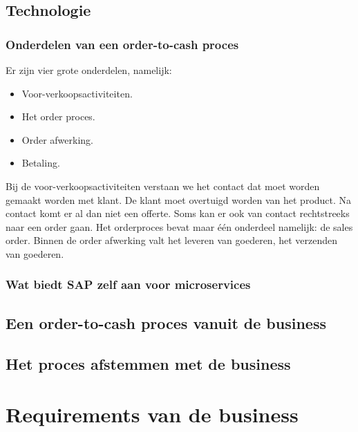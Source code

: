 \subsection{Technologie}
\subsubsection{Onderdelen van een order-to-cash proces}
Er zijn vier grote onderdelen, namelijk:
\begin{itemize}
	\item Voor-verkoopsactiviteiten.
	\item Het order proces.
	\item Order afwerking.
	\item Betaling.
\end{itemize}
Bij de voor-verkoopsactiviteiten verstaan we het contact dat moet worden gemaakt worden met klant. De klant moet overtuigd worden van het product. Na contact komt er al dan niet een offerte. Soms kan er ook van contact rechtstreeks naar een order gaan. 
Het orderproces bevat maar één onderdeel namelijk: de sales order. 
Binnen de order afwerking valt het leveren van goederen, het verzenden van goederen.
\subsubsection{Wat biedt SAP zelf aan voor microservices}
\subsection{Een order-to-cash proces vanuit de business}
\subsection{Het proces afstemmen met de business}

\section{Requirements van de business}

